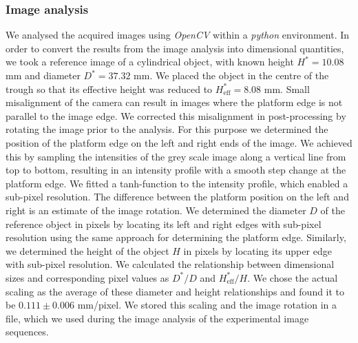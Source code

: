 \documentclass[aip,graphicx]{revtex4-1}
\newcommand{\sym}[1]{\text{#1}}
\begin{document}
\subsubsection{Image analysis}

We analysed the acquired images using \textit{OpenCV} \cite{bradski2008learning} within a \textit{python} environment. 
In order to convert the results from the image analysis into dimensional quantities, we took a reference image of a cylindrical object, with known height $H^*=10.08$ mm and diameter $D^*=37.32$ mm. 
We placed the object in the centre of the trough so that its effective height was reduced to $H^*_{\sym{eff}}=8.08$ mm.
Small misalignment of the camera can result in images where the platform edge is not parallel to the image edge. 
We corrected this misalignment in post-processing by rotating the image prior to the analysis.
For this purpose we determined the position of the platform edge on the left and right ends of the image. 
We achieved this by sampling the intensities of the grey scale image along a vertical line from top to bottom, resulting in an intensity profile with a smooth step change at the platform edge.
We fitted a tanh-function to the intensity profile, which enabled a sub-pixel resolution.
The difference between the platform position on the left and right is an estimate of the image rotation.
We determined the diameter $D$ of the reference object in pixels by locating its left and right edges with sub-pixel resolution using the same approach for determining the platform edge. 
Similarly, we determined the height of the object $H$ in pixels by locating its upper edge with sub-pixel resolution.
We calculated the relationship between dimensional sizes and corresponding pixel values as $D^*/D$ and $H^*_{\sym{eff}}/H$. 
We chose the actual scaling as the average of these diameter and height relationships and found it to be $0.111 \pm 0.006$ mm/pixel.
We stored this scaling and the image rotation in a file, which we used during the image analysis of the experimental image sequences. \\
\end{document}
